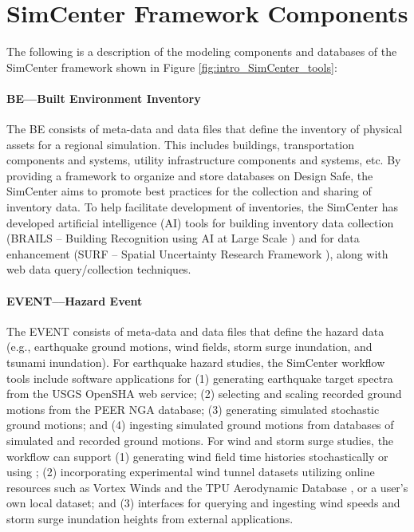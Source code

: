 \section{SimCenter Framework Components}

The following is a description of the modeling components and databases of the SimCenter framework shown in Figure \ref{fig:intro_SimCenter_tools}: 

\paragraph{BE---Built Environment Inventory} The BE consists of meta-data and data files that define the inventory of physical assets for a regional simulation. This includes buildings, transportation components and systems, utility infrastructure components and systems, etc.  By providing a framework to organize and store databases on Design Safe, the SimCenter aims to promote best practices for the collection and sharing of inventory data. To help facilitate development of inventories, the SimCenter has developed artificial intelligence (AI) tools for building inventory data collection (BRAILS – Building Recognition using AI at Large Scale ) and for data enhancement (SURF – Spatial Uncertainty Research Framework ), along with web data query/collection techniques. 

\paragraph{EVENT--–Hazard Event} The EVENT consists of meta-data and data files that define the hazard data (e.g., earthquake ground motions, wind fields, storm surge inundation, and tsunami inundation).  For earthquake hazard studies, the SimCenter workflow tools include software applications for (1) generating earthquake target spectra from the USGS OpenSHA web service; (2) selecting and scaling recorded ground motions from the PEER NGA database; (3) generating simulated stochastic ground motions; and (4) ingesting simulated ground motions from databases of simulated and recorded ground motions.  For wind and storm surge studies, the workflow can support (1) generating wind field time histories stochastically or using ; (2) incorporating experimental wind tunnel datasets utilizing online resources such as Vortex Winds \citep{kareem2017cyber} and the TPU Aerodynamic Database \citep{tpu2020tpu}, or a user’s own local dataset; and (3) interfaces for querying and ingesting wind speeds and storm surge inundation heights from external applications.

